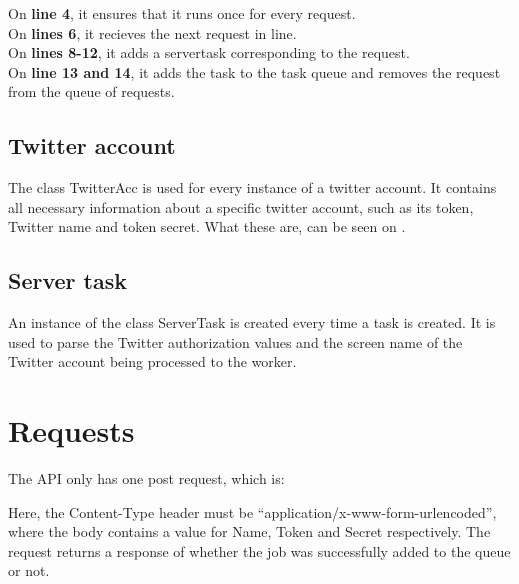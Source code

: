 On \textbf{line 4}, it ensures that it runs once for every request. \\
On \textbf{lines 6}, it recieves the next request in line.\\
On \textbf{lines 8-12}, it adds a servertask corresponding to the request.\\
On \textbf{line 13 and 14}, it adds the task to the task queue and removes the
request from the queue of requests.\\

\subsection{Twitter account}
The class TwitterAcc is used for every instance of a twitter account. It
contains all necessary information about a specific twitter account, such as its
token, Twitter name and token secret. What these are, can be seen on 
. 

\subsection{Server task}
An instance of the class ServerTask is created every time a task is created. It
is used to parse the Twitter authorization values and the screen name of the
Twitter account being processed to the worker.


\section{Requests}
The \ac{API} only has one post request, which is: \nl

\nl

Here, the Content-Type header must be ``application/x-www-form-urlencoded'',
where the body contains a value for Name, Token and Secret
respectively.
The request returns a response of whether the job was successfully added to the
queue or not.



